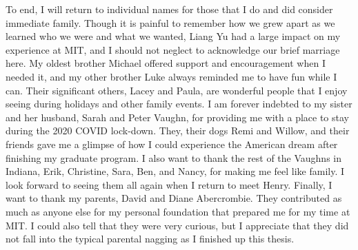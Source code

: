 To end, I will return to individual names for those that I do and did consider immediate family.
Though it is painful to remember how we grew apart as we learned who we were and what we wanted,
Liang Yu had a large impact on my experience at MIT,
and I should not neglect to acknowledge our brief marriage here.
My oldest brother Michael offered support and encouragement when I needed it, and
my other brother Luke always reminded me to have fun while I can.
Their significant others, Lacey and Paula, are wonderful people that I enjoy seeing during
holidays and other family events.
I am forever indebted to my sister and her husband, Sarah and Peter Vaughn,
for providing me with a place to stay during the 2020 COVID lock-down.
They, their dogs Remi and Willow, and their friends gave me a glimpse of how I could experience
the American dream after finishing my graduate program.
I also want to thank the rest of the Vaughns in Indiana,
Erik, Christine, Sara, Ben, and Nancy, for making me feel like family.
I look forward to seeing them all again when I return to meet Henry.
Finally, I want to thank my parents, David and Diane Abercrombie.
They contributed as much as anyone else for my personal foundation that
prepared me for my time at MIT.
I could also tell that they were very curious, but I appreciate that
they did not fall into the typical parental nagging as I finished up this thesis.

